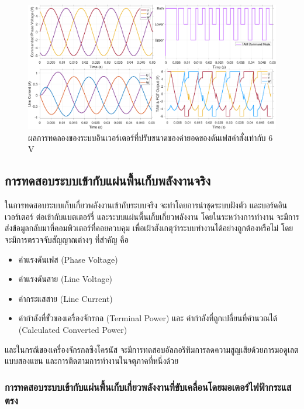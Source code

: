 \documentclass[11pt,a4paper]{article}
\begin{document}
\begin{figure}[H]
    \centering
    \includegraphics[width=\textwidth]{6V.pdf}
    \caption{ผลการทดลองของระบบอินเวอร์เตอร์ที่ปรับขนาดของค่ายอดของดันเฟสคำสั่งเท่ากับ 6 V}
    \label{6V}
\end{figure}

\newpage
\subsection{การทดสอบระบบเข้ากับแผ่นพื้นเก็บพลังงานจริง}

ในการทดสอบระบบเก็บเกี่ยวพลังงานเข้ากับระบบจริง จะทำโดยการนำชุดระบบฝังตัว และบอร์ดอินเวอร์เตอร์ ต่อเข้ากับแบตเตอร์รี่ และระบบแผ่นพื้นเก็บเกี่ยวพลังงาน โดยในระหว่างการทำงาน จะมีการส่งข้อมูลกลับมาที่คอมพิวเตอร์ที่คอยควบคุม เพื่อเฝ้าสังเกตุว่าระบบทำงานได้อย่างถูกต้องหรือไม่ โดยจะมีการตรวจจับสัญญาณต่างๆ ที่สำคัญ คือ

\begin{itemize}
    \item ค่าแรงดันเฟส (Phase Voltage)
    \item ค่าแรงดันสาย (Line Voltage)
    \item ค่ากระแสสาย (Line Current)
    \item ค่ากำลังที่ขั้วของเครื่องจักรกล (Terminal Power) และ ค่ากำลังที่ถูกเปลี่ยนที่คำนวณได้ (Calculated Converted Power)
\end{itemize}

และในกรณีของเครื่องจักรกลซิงโครนัส จะมีการทดสอบอัลกอริทึมการลดความสูญเสียด้วยการมอดูเลตแบบสองแขน และการติดตามการทำงานในจตุภาคที่หนึ่งด้วย

\subsubsection{การทดสอบระบบเข้ากับแผ่นพื้นเก็บเกี่ยวพลังงานที่ขับเคลื่อนโดยมอเตอร์ไฟฟ้ากระแสตรง}
\end{document}
